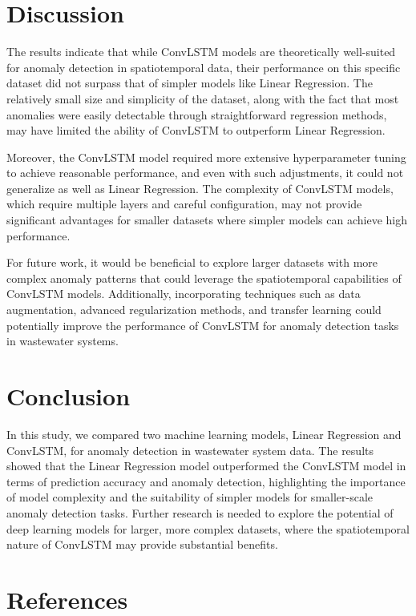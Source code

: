 \documentclass[conference]{IEEEtran}
\begin{document}
\section{Discussion}
\label{sec:discussion}
The results indicate that while ConvLSTM models are theoretically well-suited for anomaly detection in spatiotemporal data, their performance on this specific dataset did not surpass that of simpler models like Linear Regression. The relatively small size and simplicity of the dataset, along with the fact that most anomalies were easily detectable through straightforward regression methods, may have limited the ability of ConvLSTM to outperform Linear Regression.

Moreover, the ConvLSTM model required more extensive hyperparameter tuning to achieve reasonable performance, and even with such adjustments, it could not generalize as well as Linear Regression. The complexity of ConvLSTM models, which require multiple layers and careful configuration, may not provide significant advantages for smaller datasets where simpler models can achieve high performance.

For future work, it would be beneficial to explore larger datasets with more complex anomaly patterns that could leverage the spatiotemporal capabilities of ConvLSTM models. Additionally, incorporating techniques such as data augmentation, advanced regularization methods, and transfer learning could potentially improve the performance of ConvLSTM for anomaly detection tasks in wastewater systems.

\section{Conclusion}
\label{sec:conclusion}
In this study, we compared two machine learning models, Linear Regression and ConvLSTM, for anomaly detection in wastewater system data. The results showed that the Linear Regression model outperformed the ConvLSTM model in terms of prediction accuracy and anomaly detection, highlighting the importance of model complexity and the suitability of simpler models for smaller-scale anomaly detection tasks. Further research is needed to explore the potential of deep learning models for larger, more complex datasets, where the spatiotemporal nature of ConvLSTM may provide substantial benefits.

\section{References}
\end{document}
